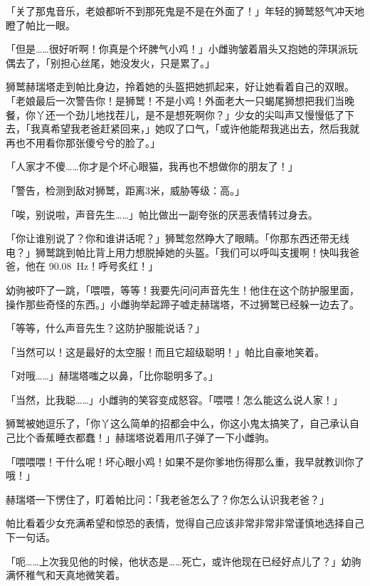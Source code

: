 \horizonline



「关了那鬼音乐，老娘都听不到那死鬼是不是在外面了！」年轻的狮鹫怒气冲天地瞪了帕比一眼。

「但是……很好听啊！你真是个坏脾气小鸡！」小雌驹皱着眉头又抱她的萍琪派玩偶去了，「别担心丝尾，她没发火，只是累了。」

狮鹫赫瑞塔走到帕比身边，拎着她的头盔把她抓起来，好让她看着自己的双眼。「老娘最后一次警告你！是狮鹫！不是小鸡！外面老大一只蝎尾狮想把我们当晚餐，你丫还一个劲儿地找茬儿，是不是想死啊你？」少女的尖叫声又慢慢低了下去，「我真希望我老爸赶紧回来，」她叹了口气，「或许他能帮我逃出去，然后我就再也不用看你那张傻兮兮的脸了。」

「人家才不傻……你才是个坏心眼猫，我再也不想做你的朋友了！」

「{\mt 警告，检测到敌对狮鹫，距离3米，威胁等级：高。}」

「唉，别说啦，声音先生……」帕比做出一副夸张的厌恶表情转过身去。

「你让谁别说了？你和谁讲话呢？」狮鹫忽然睁大了眼睛。「你那东西还带无线电？」狮鹫跳到帕比背上用力想脱掉她的头盔。「我们可以呼叫支援啊！快叫我爸爸，他在 \SI{90.08}{Hz}！呼号炙红！」

幼驹被吓了一跳，「喂喂，等等！我要先问问声音先生！他住在这个防护服里面，操作那些奇怪的东西。」小雌驹举起蹄子嘘走赫瑞塔，不过狮鹫已经躲一边去了。

「等等，什么声音先生？这防护服能说话？」

「当然可以！这是最好的太空服！而且它超级聪明！」帕比自豪地笑着。

「对哦……」赫瑞塔嗤之以鼻，「比你聪明多了。」

「当然，比我聪……」小雌驹的笑容变成怒容。「喂喂！怎么能这么说人家！」

狮鹫被她逗乐了，「你丫这么简单的招都会中么，你这小鬼太搞笑了，自己承认自己比个香蕉睡衣都蠢！」赫瑞塔说着用爪子弹了一下小雌驹。

「喂喂喂！干什么呢！坏心眼小鸡！如果不是你爹地伤得那么重，我早就教训你了哦！」

赫瑞塔一下愣住了，盯着帕比问：「我老爸怎么了？你怎么认识我老爸？」

帕比看着少女充满希望和惊恐的表情，觉得自己应该非常非常非常谨慎地选择自己下一句话。

「呃……上次我见他的时候，他状态是……死亡，或许他现在已经好点儿了？」幼驹满怀稚气和天真地微笑着。

